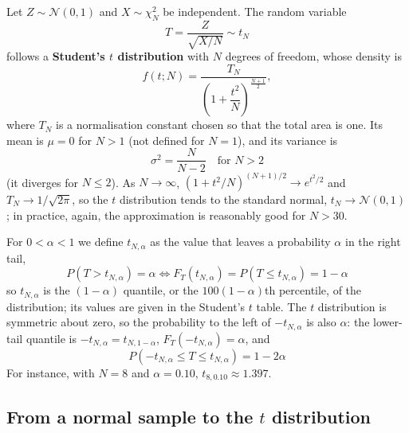 \documentclass[letterpaper,11pt,leqno]{book}
\begin{document}
Let $Z \sim \mathcal{N}(0, 1)$ and $X \sim \chi_N^2$ be independent. The random variable
\begin{equation}
\boxed{T = \frac{Z}{\sqrt{X/N}} \sim t_N}
\label{eq:t_definition}
\end{equation}
follows a \textbf{Student's $t$ distribution} with $N$ degrees of freedom, whose density is
\begin{equation}
f(t; N) = \frac{T_N}{\left(1 + \dfrac{t^2}{N}\right)^{\frac{N+1}{2}}},
\label{eq:t_pdf}
\end{equation}
where $T_N$ is a normalisation constant chosen so that the total area is one. Its mean is $\mu = 0$ for $N > 1$ (not defined for $N = 1$), and its variance is
\begin{equation}
\boxed{\sigma^2 = \frac{N}{N - 2} \quad \text{for } N > 2}
\label{eq:t_variance}
\end{equation}
(it diverges for $N \le 2$). As $N \to \infty$, $\left(1 + t^2/N\right)^{(N+1)/2} \to e^{t^2/2}$ and $T_N \to 1/\sqrt{2\pi}$, so the $t$ distribution tends to the standard normal, $t_N \to \mathcal{N}(0, 1)$; in practice, again, the approximation is reasonably good for $N > 30$.

For $0 < \alpha < 1$ we define $t_{N,\alpha}$ as the value that leaves a probability $\alpha$ in the right tail,
\begin{equation}
\boxed{P(T > t_{N,\alpha}) = \alpha \iff F_T(t_{N,\alpha}) = P(T \le t_{N,\alpha}) = 1 - \alpha}
\label{eq:t_critical}
\end{equation}
so $t_{N,\alpha}$ is the $(1 - \alpha)$ quantile, or the $100(1 - \alpha)$th percentile, of the distribution; its values are given in the Student's $t$ table. The $t$ distribution is symmetric about zero, so the probability to the left of $-t_{N,\alpha}$ is also $\alpha$: the lower-tail quantile is $-t_{N,\alpha} = t_{N,1-\alpha}$, $F_T(-t_{N,\alpha}) = \alpha$, and
\begin{equation}
\boxed{P(-t_{N,\alpha} \le T \le t_{N,\alpha}) = 1 - 2\alpha}
\label{eq:t_symmetric}
\end{equation}
For instance, with $N = 8$ and $\alpha = 0.10$, $t_{8,0.10} \approx 1.397$.

\subsection{From a normal sample to the \texorpdfstring{$t$}{t} distribution}
\label{sec:t_sample}
\end{document}
